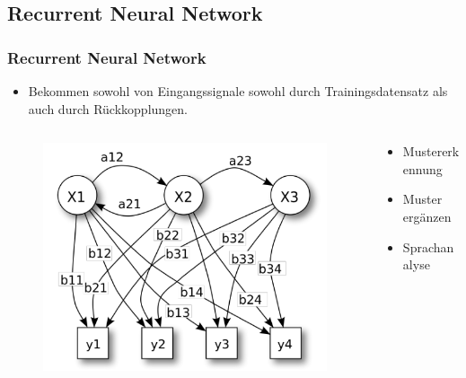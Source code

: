 \subsection{Recurrent Neural Network}

\begin{frame}[fragile]
\frametitle{Recurrent Neural Network}

\begin{itemize}
\item Bekommen sowohl von Eingangssignale sowohl durch Trainingsdatensatz als auch durch Rückkopplungen. 
\end{itemize}

\begin{columns}
\hspace{10mm}

\begin{column}{.6\textwidth}

\begin{figure}
	\includegraphics[width=\linewidth]{./zusatz/recurrentNN/img/rnn_aufbau_alpha}
\end{figure}

\end{column}
\begin{column}{.4\textwidth}

\vspace{-24mm}

\begin{itemize}
\item Mustererkennung
\item Muster ergänzen
\item Sprachanalyse
\end{itemize}
\end{column}

\end{columns}


\end{frame}
